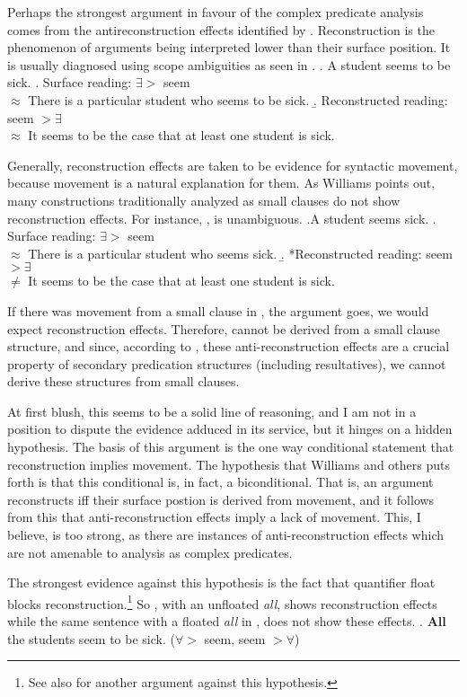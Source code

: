 \documentclass[MilwayThesis]{subfiles}
\begin{document}
Perhaps the strongest argument in favour of the complex predicate analysis comes from the antireconstruction effects identified by \textcite[293--296]{williams1983against}.
Reconstruction is the phenomenon of arguments being interpreted lower than their surface position.
It is usually diagnosed using scope ambiguities as seen in \Next.
\ex. A student seems to be sick.
\a. Surface reading: $\exists >$ seem\\
$\approx$ There is a particular student who seems to be sick.
\b. Reconstructed reading: seem $> \exists$\\
$\approx$ It seems to be the case that at least one student is sick.

Generally, reconstruction effects are taken to be evidence for syntactic movement, because movement is a natural explanation for them.
As Williams points out, many constructions traditionally analyzed as small clauses do not show reconstruction effects.
For instance, \Next, is unambiguous.
\ex.A student seems sick.
\a. Surface reading: $\exists >$ seem\\
$\approx$ There is a particular student who seems sick.
\b. *Reconstructed reading: seem $> \exists$\\
$\neq$ It seems to be the case that at least one student is sick.

If there was movement from a small clause in \Last, the argument goes, we would expect reconstruction effects.
Therefore, \Last cannot be derived from a small clause structure, and since, according to \textcite{irimia2012secondary}, these anti-reconstruction effects are a crucial property of secondary predication structures (including resultatives), we cannot derive these structures from small clauses.

At first blush, this seems to be a solid line of reasoning, and I am not in a position to dispute the evidence adduced in its service, but it hinges on a hidden hypothesis.
The basis of this argument is the one way conditional statement that reconstruction implies movement.
The hypothesis that Williams and others puts forth is that this conditional is, in fact, a biconditional.
That is, an argument reconstructs iff their surface postion is derived from movement, and it follows from this that anti-reconstruction effects imply a lack of movement.
This, I believe, is too strong, as there are instances of anti-reconstruction effects which are not amenable to analysis as complex predicates.

The strongest evidence against this hypothesis is the fact that quantifier float blocks reconstruction.\footnote{See also \textcite{bobaljik2004anti} for another argument against this hypothesis.}
So \Next, with an unfloated \textit{all}, shows reconstruction effects while the same sentence with a floated \textit{all} in \NNext, does not show these effects.
\ex. \textbf{All} the students seem to be sick. ($\forall >$ seem, seem $> \forall$)
\end{document}
